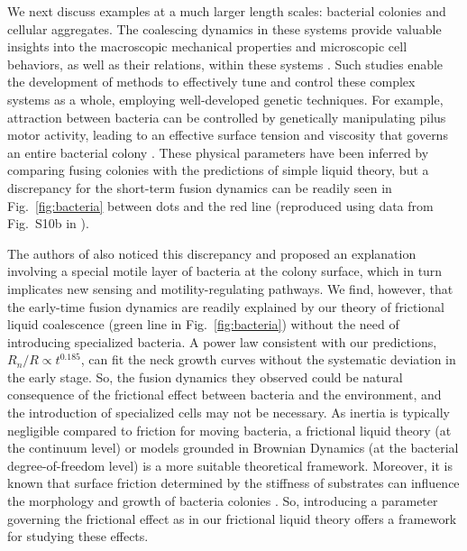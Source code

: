 \documentclass[%
reprint,
amsmath,amssymb,
aps,
]{revtex4-2}
\begin{document}
	We next discuss examples at a much larger length scales: bacterial colonies and cellular aggregates. The coalescing dynamics in these systems provide valuable insights into the macroscopic mechanical properties and microscopic cell behaviors, as well as their relations, within these systems \cite{welker2018molecular,ponisch2018pili,grosserCellNucleusShape2021a, koshelevaCellSpheroidFusion2020a}. Such studies enable the development of methods to effectively tune and control these complex systems as a whole, employing well-developed genetic techniques. For example, attraction between bacteria can be controlled by genetically manipulating pilus motor activity, leading to an effective surface tension and viscosity that governs an entire bacterial colony \cite{welker2018molecular}. These physical parameters have been inferred by comparing fusing colonies with the predictions of simple liquid theory, but a discrepancy for the short-term fusion dynamics can be readily seen in Fig.~\ref{fig:bacteria} between dots and the red line (reproduced using data from Fig.~S10b in \cite{welker2018molecular}).
 
 The authors of \cite{welker2018molecular} also noticed this discrepancy and proposed an explanation involving a special motile layer of bacteria at the colony surface, which in turn implicates new sensing and motility-regulating pathways. We find, however, that the early-time fusion dynamics are readily explained by our theory of frictional liquid coalescence (green line in Fig.~\ref{fig:bacteria}) without the need of introducing specialized bacteria. A power law consistent with our predictions, $R_n/R\propto t^{0.185}$, can fit the neck growth curves without the systematic deviation in the early stage. So, the fusion dynamics they observed could be natural consequence of the frictional effect between bacteria and the environment, and the introduction of specialized cells may not be necessary. As inertia is typically negligible compared to friction for moving bacteria, a frictional liquid theory (at the continuum level) or models grounded in Brownian Dynamics (at the bacterial degree-of-freedom level) is a more suitable theoretical framework. Moreover, it is known that surface friction determined by the stiffness of substrates can influence the morphology and growth of bacteria colonies \cite{fei2020nonuniform, asp2022spreading}. So, introducing a parameter governing the frictional effect as in our frictional liquid theory offers a framework for studying these effects.  
	
\end{document}
